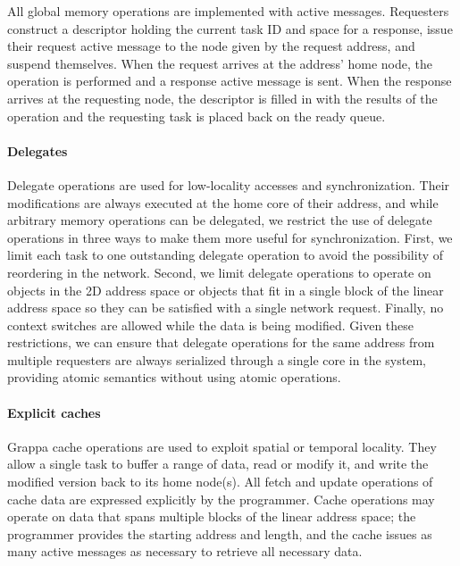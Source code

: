 
All global memory operations are implemented with active
messages. Requesters construct a descriptor holding the current task
ID and space for a response, issue their request active message to the
node given by the request address, and suspend themselves. When the
request arrives at the address' home node, the operation is performed
and a response active message is sent. When the response arrives at
the requesting node, the descriptor is filled in with the results of
the operation and the requesting task is placed back on the ready queue.

\paragraph{Delegates} Delegate operations are used for low-locality
accesses and synchronization. Their modifications are always executed at
the home core of their address, and while arbitrary memory operations
can be delegated, we restrict the use of delegate operations in three
ways to make them more useful for synchronization. First, we limit each
task to one outstanding delegate operation to avoid the possibility of
reordering in the network. Second, we limit delegate operations to
operate on objects in the 2D address space or objects that fit in a
single block of the linear address space so they can be satisfied with a
single network request. Finally, no context switches are allowed while
the data is being modified. Given these restrictions, we can ensure that
delegate operations for the same address from multiple requesters are
always serialized through a single core in the system, providing atomic
semantics without using atomic operations.

\paragraph{Explicit caches} Grappa cache operations are used to exploit
spatial or temporal locality. They allow a single task to buffer a range
of data, read or modify it, and write the modified version back to its
home node(s). All fetch and update operations of cache data are
expressed explicitly by the programmer. Cache operations may operate on
data that spans multiple blocks of the linear address space; the
programmer provides the starting address and length, and the cache
issues as many active messages as necessary to retrieve all necessary
data.

